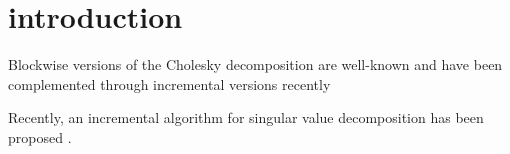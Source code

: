 \section{introduction}
Blockwise versions of the Cholesky decomposition are well-known \cite{Choi1996} and have been complemented through incremental versions recently \cite{Polok2013}


Recently, an incremental algorithm for singular value decomposition has been proposed \cite{Iodice2022}.